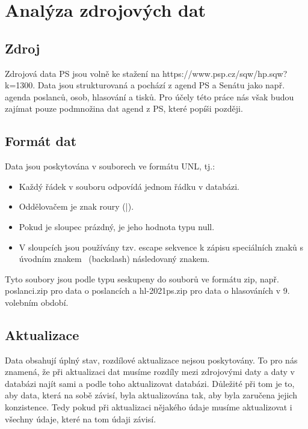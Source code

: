 \chapter{Analýza zdrojových dat}

\setcounter{page}{1}

\section{Zdroj}

Zdrojová data PS jsou volně ke stažení na https://www.psp.cz/sqw/hp.sqw?k=1300. Data jsou strukturovaná a pochází z agend PS a Senátu jako např. agenda poslanců, osob, hlasování a tisků. Pro účely této práce nás však budou zajímat pouze podmnožina dat agend z PS, které popíši později. 

\section{Formát dat}
Data jsou poskytována v souborech ve formátu UNL, tj.:

\begin{itemize}
	\item Každý řádek v souboru odpovídá jednom řádku v databázi.
	\item Oddělovačem je znak roury (|).
	\item Pokud je sloupec prázdný, je jeho hodnota typu null.
	\item V sloupcích jsou používány tzv. escape sekvence k zápisu speciálních znaků s úvodním znakem \ (backslash) následovaný znakem.
\end{itemize}

Tyto soubory jsou podle typu seskupeny do souborů ve formátu zip, např. poslanci.zip pro data o poslancích a hl-2021ps.zip pro data o hlasováních v 9. volebním období.

\section{Aktualizace}

Data obsahují úplný stav, rozdílové aktualizace nejsou poskytovány. To pro nás znamená, že při aktualizaci dat musíme rozdíly mezi zdrojovými daty a daty v databázi najít sami a podle toho aktualizovat databázi. Důležité při tom je to, aby data, která na sobě závisí, byla aktualizována tak, aby byla zaručena jejich konzistence. Tedy pokud při aktualizaci nějakého údaje musíme aktualizovat i všechny údaje, které na tom údaji závisí.

